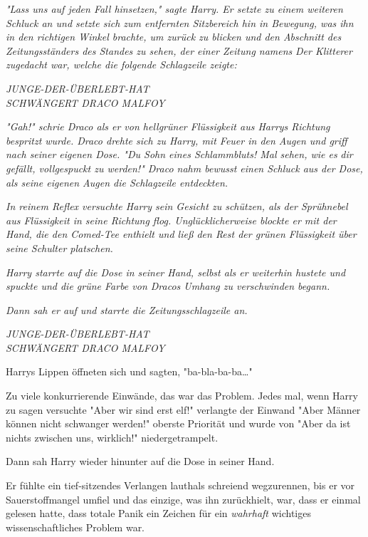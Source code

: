 {\emph{"Lass uns auf jeden Fall hinsetzen," sagte Harry. Er setzte zu einem weiteren Schluck an und setzte sich zum entfernten Sitzbereich hin in Bewegung, was ihn in den richtigen Winkel brachte, um zurück zu blicken und den Abschnitt des Zeitungsständers des Standes zu sehen, der einer Zeitung namens} \emph{\emph{Der Klitterer}} \emph{zugedacht war, welche die folgende Schlagzeile zeigte:}

\emph{JUNGE-DER-ÜBERLEBT-HAT\\ SCHWÄNGERT DRACO MALFOY}

\emph{"\emph{Gah!}" schrie Draco als er von hellgrüner Flüssigkeit aus Harrys Richtung} \emph{bespritzt wurde. Draco drehte sich zu Harry, mit Feuer in den Augen und griff nach seiner eigenen Dose. "Du Sohn eines Schlammbluts! Mal sehen, wie es} \emph{\emph{dir}} \emph{gefällt, vollgespuckt zu werden!" Draco nahm bewusst einen Schluck aus der Dose, als seine eigenen Augen die Schlagzeile entdeckten.}

\emph{In reinem Reflex versuchte Harry sein Gesicht zu schützen, als der Sprühnebel aus Flüssigkeit in seine Richtung flog. Unglücklicherweise blockte er mit der Hand, die den Comed-Tee enthielt und ließ den Rest der grünen Flüssigkeit über seine Schulter platschen.}

\emph{Harry starrte auf die Dose in seiner Hand, selbst als er weiterhin hustete und spuckte und die grüne Farbe von Dracos Umhang zu verschwinden begann.}

\emph{Dann sah er auf und starrte die Zeitungsschlagzeile an.}

\emph{JUNGE-DER-ÜBERLEBT-HAT\\ SCHWÄNGERT DRACO MALFOY}

Harrys Lippen öffneten sich und sagten, "ba-bla-ba-ba…"

Zu viele konkurrierende Einwände, das war das Problem. Jedes mal, wenn Harry zu sagen versuchte "Aber wir sind erst elf!" verlangte der Einwand "Aber Männer können nicht schwanger werden!" oberste Priorität und wurde von "Aber da ist nichts zwischen uns, wirklich!" niedergetrampelt.

Dann sah Harry wieder hinunter auf die Dose in seiner Hand.

Er fühlte ein tief-sitzendes Verlangen lauthals schreiend wegzurennen, bis er vor Sauerstoffmangel umfiel und das einzige, was ihn zurückhielt, war, dass er einmal gelesen hatte, dass totale Panik ein Zeichen für ein \emph{wahrhaft} wichtiges wissenschaftliches Problem war.

}

